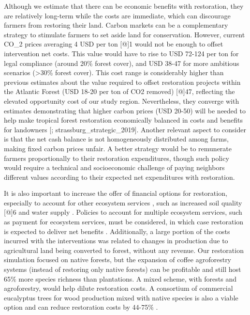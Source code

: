 \documentclass[
	12pt,				%
	oneside,			%
	a4paper,			%
	chapter=TITLE,		%
	section=TITLE,		%
	brazil,			%
	english				%
	]{abntex2}
\begin{document}
Although we estimate that there can be economic benefits with restoration, they are relatively long-term while the costs are immediate, which can discourage farmers from restoring their land. Carbon markets can be a complementary strategy to stimulate farmers to set aside land for conservation. However, current CO\_2 prices averaging 4 USD per ton {[}@{]}1 would not be enough to offset intervention net costs. This value would have to rise to USD 72-124 per ton for legal compliance (around 20\% forest cover), and USD 38-47 for more ambitious scenarios (\textgreater30\% forest cover). This cost range is considerably higher than previous estimates about the value required to offset restoration projects within the Atlantic Forest (USD 18-20 per ton of CO2 removed) {[}@{]}47, reflecting the elevated opportunity cost of our study region. Nevertheless, they converge with estimates demonstrating that higher carbon prices (USD 20-50) will be needed to help make tropical forest restoration economically balanced in costs and benefits for landowners {[}\textcite{busch_potential_2019}; strassburg\_strategic\_2019{]}. Another relevant aspect to consider is that the net cash balance is not homogeneously distributed among farms, making fixed carbon prices unfair. A better strategy would be to remunerate farmers proportionally to their restoration expenditures, though such policy would require a technical and socioeconomic challenge of paying neighbors different values according to their expected net expenditures with restoration.

It is also important to increase the offer of financial options for restoration, especially to account for other ecosystem services \autocite{barral_quantifying_2015,benayas_enhancement_2009,wade_ecological_2008}, such as increased soil quality {[}@{]}6 and water supply \autocite{teixeira_regeneration_2021}. Policies to account for multiple ecosystem services, such as payment for ecosystem services, must be considered, in which case restoration is expected to deliver net benefits \autocite{de_groot_benefits_2013,bradbury_economic_2021}. Additionally, a large portion of the costs incurred with the interventions was related to changes in production due to agricultural land being converted to forest, without any revenue. Our restoration simulation focused on native forests, but the expansion of coffee agroforestry systems (instead of restoring only native forests) can be profitable \autocite{goncalves_potential_2021} and still host 65\% more species richness than plantations\autocite{de_beenhouwer_global_2013}. A mixed scheme, with forests and agroforestry, would help dilute restoration costs. A consortium of commercial eucalyptus trees for wood production mixed with native species is also a viable option \autocite{amazonas_high_2018} and can reduce restoration costs by 44-75\% \autocite{brancalion_exotic_2020}.
\end{document}
